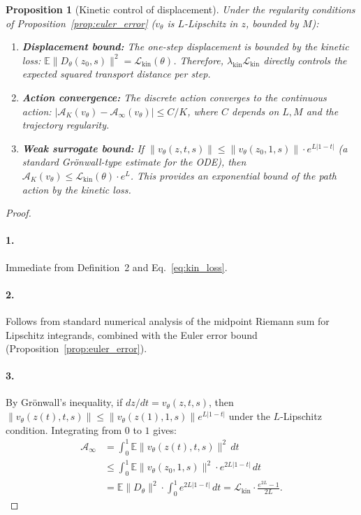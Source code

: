 \documentclass[letterpaper]{article}
\newtheorem{proposition}{Proposition}[section]
\newcommand{\E}{\mathbb{E}}
\newcommand{\cA}{\mathcal{A}}
\newcommand{\cL}{\mathcal{L}}
\begin{document}
\begin{proposition}[Kinetic control of displacement]
\label{prop:kinetic_control}
Under the regularity conditions of Proposition~\ref{prop:euler_error}
($v_\theta$ is $L$-Lipschitz in $z$, bounded by $M$):
\begin{enumerate}[nosep]
    \item \textbf{Displacement bound:}
    The one-step displacement is bounded by the kinetic loss:
    $\E\|D_\theta(z_0,s)\|^2 = \cL_{\text{kin}}(\theta)$.
    Therefore, $\lambda_{\text{kin}}\cL_{\text{kin}}$ directly controls
    the expected squared transport distance per step.

    \item \textbf{Action convergence:}
    The discrete action converges to the continuous action:
    $|\cA_K(v_\theta) - \cA_\infty(v_\theta)| \leq C / K$,
    where $C$ depends on $L, M$ and the trajectory regularity.

    \item \textbf{Weak surrogate bound:}
    If $\|v_\theta(z,t,s)\| \leq \|v_\theta(z_0,1,s)\| \cdot e^{L|1-t|}$
    (a standard Gr\"onwall-type estimate for the ODE), then
    $\cA_K(v_\theta) \leq \cL_{\text{kin}}(\theta) \cdot e^{L}$.
    This provides an exponential bound of the path action by the kinetic loss.
\end{enumerate}
\end{proposition}

\begin{proof}
\paragraph{1.} Immediate from Definition~2 and Eq.~\eqref{eq:kin_loss}.

\paragraph{2.} Follows from standard numerical analysis of the midpoint
Riemann sum for Lipschitz integrands, combined with the Euler error bound
(Proposition~\ref{prop:euler_error}).

\paragraph{3.} By Gr\"onwall's inequality, if $dz/dt = v_\theta(z,t,s)$,
then $\|v_\theta(z(t),t,s)\| \leq \|v_\theta(z(1),1,s)\| e^{L|1-t|}$
under the $L$-Lipschitz condition. Integrating from $0$ to $1$ gives:
\begin{align}
    \cA_\infty &= \int_0^1 \E\|v_\theta(z(t),t,s)\|^2\,dt \\
    &\leq \int_0^1 \E\|v_\theta(z_0,1,s)\|^2 \cdot e^{2L|1-t|}\,dt \\
    &= \E\|D_\theta\|^2 \cdot \int_0^1 e^{2L|1-t|}\,dt
    = \cL_{\text{kin}} \cdot \frac{e^{2L}-1}{2L}.
\end{align}
\end{proof}
\end{document}
